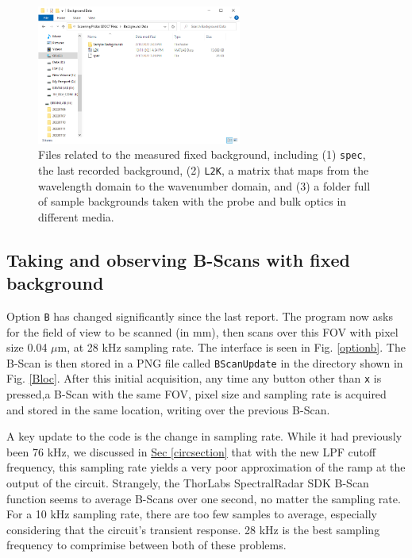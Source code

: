 \documentclass{article}
\begin{document}
\begin{figure}[!h]
	\centering
	\includegraphics[width=0.6\textwidth]{Data for Probe Writeup/spec location.png}
	\caption{Files related to the measured fixed background, including (1) \texttt{spec}, the last recorded background, (2) \texttt{L2K}, a matrix that maps from the wavelength domain to the wavenumber domain, and (3) a folder full of sample backgrounds taken with the probe and bulk optics in different media.}\label{specloc}
\end{figure}

\subsection{Taking and observing B-Scans with fixed background}

\par{Option \texttt{B} has changed significantly since the last report. The program now asks for the field of view to be scanned (in mm), then scans over this FOV with pixel size 0.04 $\mu$m, at 28 kHz sampling rate. The interface is seen in Fig. \ref{optionb}. The B-Scan is then stored in a PNG file called \texttt{BScanUpdate} in the directory shown in Fig. \ref{Bloc}. After this initial acquisition, any time any button other than \texttt{x} is pressed,a B-Scan with the same FOV, pixel size and sampling rate is acquired and stored in the same location, writing over the previous B-Scan.}

\par{A key update to the code is the change in sampling rate. While it had previously been 76 kHz, we discussed in \hyperlink{circsection}{Sec \ref{circsection}} that with the new LPF cutoff frequency, this sampling rate yields a very poor approximation of the ramp at the output of the circuit. Strangely, the ThorLabs SpectralRadar SDK B-Scan function seems to average B-Scans over one second, no matter the sampling rate. For a 10 kHz sampling rate, there are too few samples to average, especially considering that the circuit's transient response. 28 kHz is the best sampling frequency to comprimise between both of these problems.}
\end{document}
